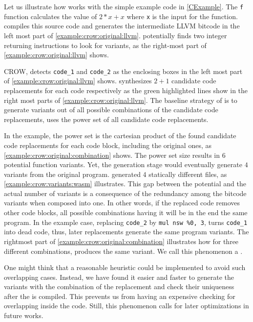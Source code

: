 Let us illustrate how works with the simple example code in \autoref{CExample}. The \texttt{f} function calculates the value of $2 * x + x$ where \texttt{x} is the input for the function.  compiles this source code and generates the intermediate LLVM bitcode in the left most part of \autoref{example:crow:original:llvm}. potentially finds two integer returning instructions to look for variants, as the right-most part of \autoref{example:crow:original:llvm} shows.


    

CROW, detects \texttt{code\_1} and \texttt{code\_2} as the enclosing boxes in the left most part of \autoref{example:crow:original:llvm} shows. synthesizes $2 + 1$ candidate code replacements for each code respectively as the green highlighted lines show in the right most parts of \autoref{example:crow:original:llvm}.
The baseline strategy of is to generate variants out of all possible combinations of the candidate code replacements, \ie uses the power set of all candidate code replacements.

In the example, the power set is the cartesian product of the found candidate code replacements for each code block, including the original ones, as \autoref{example:crow:original:combination} shows. The power set size results in $6$ potential function variants. Yet, the generation stage would eventually generate $4$ variants from the original program. generated 4 statically different files, as \autoref{example:crow:variants:wasm} illustrates. This gap between the potential and the actual number of variants is a consequence of the redundancy among the bitcode variants when composed into one. In other words, if the replaced code removes other code blocks, all possible combinations having it will be in the end the same program. In the example case, replacing \texttt{code\_2} by \texttt{mul nsw \%0, 3}, turns \texttt{code\_1} into dead code, thus, later replacements generate the same program variants. The rightmost part of \autoref{example:crow:original:combination} illustrates how for three different combinations, produces the same variant. We call this phenomenon a .



One might think that a reasonable heuristic could be implemented to avoid such overlapping cases. Instead, we have found it easier and faster to generate the variants with the combination of the replacement and check their uniqueness after the is compiled. This prevents us from having an expensive checking for overlapping inside the code. Still, this phenomenon calls for later optimizations in future works.

